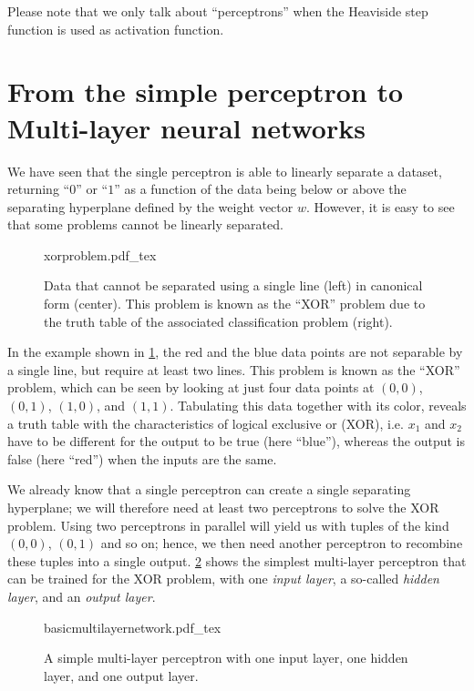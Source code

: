Please note that we only talk about ``perceptrons'' when the Heaviside step function is used as activation function.

\section{From the simple perceptron to Multi-layer neural networks}

We have seen that the single perceptron is able to linearly separate a dataset, returning ``$0$'' or ``$1$'' as a function of the data being below or above the separating hyperplane defined by the weight vector $w$. However, it is easy to see that some problems cannot be linearly separated.
%
\begin{figure}[htb]
    \centering
    \def\svgwidth{0.9\textwidth}
    {xorproblem.pdf_tex}
    \caption{Data that cannot be separated using a single line (left) in canonical form (center). This problem is known as the ``XOR'' problem due to the truth table of the associated classification problem (right).\label{fig:xorproblem}}
\end{figure}
%
In the example shown in \cref{fig:xorproblem}, the red and the blue data points are not separable by a single line, but require at least two lines. This problem is known as the ``XOR'' problem, which can be seen by looking at just four data points at $(0,0)$, $(0,1)$, $(1,0)$, and $(1,1)$. Tabulating this data together with its color, reveals a truth table with the characteristics of logical exclusive or (XOR), i.e. $x_1$ and $x_2$ have to be different for the output to be true (here ``blue''), whereas the output is false (here ``red'') when the inputs are the same.

We already know that a single perceptron can create a single separating hyperplane; we will therefore need at least two perceptrons to solve the XOR problem.
Using two perceptrons in parallel will yield us with tuples of the kind $(0,0)$, $(0,1)$ and so on; hence, we then need another perceptron to recombine these tuples into a single output.
\cref{fig:basicmultilayer} shows the simplest multi-layer perceptron that can be trained for the XOR problem, with one \textsl{input layer}, a so-called \textsl{hidden layer}, and an \textsl{output layer}.

\begin{figure}
    \centering
    \def\svgwidth{0.8\textwidth}
    {basicmultilayernetwork.pdf_tex}
    \caption{A simple multi-layer perceptron with one input layer, one hidden layer, and one output layer. \label{fig:basicmultilayer}}
\end{figure}

